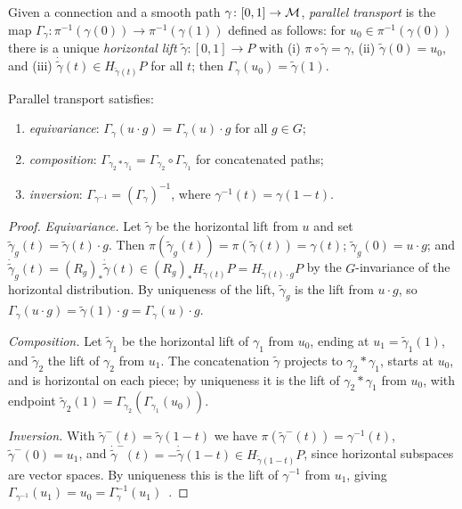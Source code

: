 \begin{definition}
\label{def:gauge:parallel-transport}
Given a connection and a smooth path $\gamma\colon [0,1] \to \mathcal{M}$,
\emph{parallel transport} is the map
$\Gamma_\gamma\colon \pi^{-1}(\gamma(0)) \to \pi^{-1}(\gamma(1))$ defined as
follows: for $u_0 \in \pi^{-1}(\gamma(0))$ there is a unique \emph{horizontal
lift} $\tilde\gamma\colon [0,1] \to P$ with (i) $\pi \circ \tilde\gamma =
\gamma$, (ii) $\tilde\gamma(0) = u_0$, and (iii) $\dot{\tilde\gamma}(t) \in
H_{\tilde\gamma(t)} P$ for all $t$; then $\Gamma_\gamma(u_0) = \tilde\gamma(1)$.
\end{definition}

\begin{theorem}
\label{thm:gauge:transport-props}
Parallel transport satisfies:
\begin{enumerate}
  \item \emph{equivariance}: $\Gamma_\gamma(u \cdot g) = \Gamma_\gamma(u) \cdot
    g$ for all $g \in G$;
  \item \emph{composition}: $\Gamma_{\gamma_2 * \gamma_1} = \Gamma_{\gamma_2}
    \circ \Gamma_{\gamma_1}$ for concatenated paths;
  \item \emph{inversion}: $\Gamma_{\gamma^{-1}} = (\Gamma_\gamma)^{-1}$, where
    $\gamma^{-1}(t) = \gamma(1-t)$.
\end{enumerate}
\end{theorem}

\begin{proof}
\emph{Equivariance.} Let $\tilde\gamma$ be the horizontal lift from $u$ and set
$\tilde\gamma_g(t) = \tilde\gamma(t) \cdot g$. Then $\pi(\tilde\gamma_g(t)) =
\pi(\tilde\gamma(t)) = \gamma(t)$; $\tilde\gamma_g(0) = u \cdot g$; and
$\dot{\tilde\gamma}_g(t) = (R_g)_* \dot{\tilde\gamma}(t) \in (R_g)_*
H_{\tilde\gamma(t)} P = H_{\tilde\gamma(t)\cdot g} P$ by the $G$-invariance of the
horizontal distribution. By uniqueness of the lift, $\tilde\gamma_g$ is the lift
from $u \cdot g$, so $\Gamma_\gamma(u \cdot g) = \tilde\gamma(1)\cdot g =
\Gamma_\gamma(u)\cdot g$.

\emph{Composition.} Let $\tilde\gamma_1$ be the horizontal lift of $\gamma_1$
from $u_0$, ending at $u_1 = \tilde\gamma_1(1)$, and $\tilde\gamma_2$ the lift of
$\gamma_2$ from $u_1$. The concatenation $\tilde\gamma$ projects to
$\gamma_2 * \gamma_1$, starts at $u_0$, and is horizontal on each piece; by
uniqueness it is the lift of $\gamma_2 * \gamma_1$ from $u_0$, with endpoint
$\tilde\gamma_2(1) = \Gamma_{\gamma_2}(\Gamma_{\gamma_1}(u_0))$.

\emph{Inversion.} With $\tilde\gamma^-(t) = \tilde\gamma(1-t)$ we have
$\pi(\tilde\gamma^-(t)) = \gamma^{-1}(t)$, $\tilde\gamma^-(0) = u_1$, and
$\dot{\tilde\gamma}^-(t) = -\dot{\tilde\gamma}(1-t) \in H_{\tilde\gamma(1-t)} P$,
since horizontal subspaces are vector spaces. By uniqueness this is the lift of
$\gamma^{-1}$ from $u_1$, giving $\Gamma_{\gamma^{-1}}(u_1) = u_0 =
\Gamma_\gamma^{-1}(u_1)$~\citep[Ch.~II, Prop.~3.2]{Kobayashi1996}.
\end{proof}

